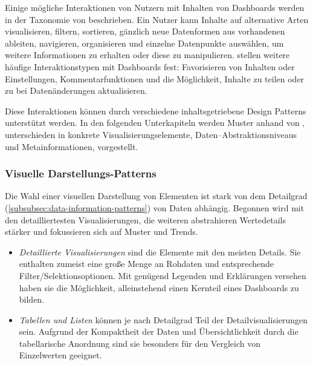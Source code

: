 Einige mögliche Interaktionen von Nutzern mit Inhalten von Dashboards werden in der Taxonomie von \citeauthor[S. 1]{Heer.InteractiveDynamicsVisualAnalysis.2012} beschrieben.
Ein Nutzer kann Inhalte auf alternative Arten visualisieren, filtern, sortieren, gänzlich neue Datenformen aus vorhandenen ableiten, navigieren, organisieren und einzelne Datenpunkte auswählen, um weitere Informationen zu erhalten oder diese zu manipulieren.
\citeauthor[S. 25]{MarcusHomannVassilenaBanovaPaulOelbermannHolgerWittgesandHelmutKrcmar.TowardsUserInterfaceComponentsforDashboardApplicationsonSmartphones.2013} stellen weitere häufige Interaktionstypen mit Dashboards fest:
Favorisieren von Inhalten oder Einstellungen, Kommentarfunktionen und die Möglichkeit, Inhalte zu teilen oder zu bei Datenänderungen aktualisieren.

Diese Interaktionen können durch verschiedene inhaltsgetriebene Design Patterns unterstützt werden.
In den folgenden Unterkapiteln werden Muster anhand von \citeauthor[S. 3--5]{Bach.DashboardDesignPatterns.2023}, unterschieden in konkrete Visualisierungselemente, Daten--Abstraktionsniveaus und Metainformationen, vorgestellt.

\subsubsection{Visuelle Darstellungs-Patterns}

Die Wahl einer visuellen Darstellung von Elementen ist stark von dem Detailgrad (\autoref{subsubsec:data-information-patterns}) von Daten abhängig.
Begonnen wird mit den detailliertesten Visualisierungen, die weiteren abstrahieren Wertedetails stärker und fokussieren sich auf Muster und Trends.

\begin{itemize}
    \item \emph{Detaillierte Visualisierungen} sind die Elemente mit den meisten Details.
    Sie enthalten zumeist eine große Menge an Rohdaten und entsprechende Filter/Selektionsoptionen.
    Mit genügend Legenden und Erklärungen versehen haben sie die Möglichkeit, alleinstehend einen Kernteil eines Dashboards zu bilden.
    \item \emph{Tabellen und Listen} können je nach Detailgrad Teil der Detailvisualisierungen sein.
    Aufgrund der Kompaktheit der Daten und Übersichtlichkeit durch die tabellarische Anordnung sind sie besonders für den Vergleich von Einzelwerten geeignet.
\end{itemize}

